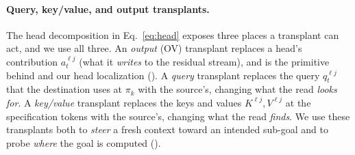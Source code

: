 \paragraph{Query, key/value, and output transplants.} The head decomposition in Eq.~\ref{eq:head} exposes three places a transplant can act, and we use all three. An \emph{output} (OV) transplant replaces a head's contribution $a_t^{\ell j}$ (what it \emph{writes} to the residual stream), and is the primitive behind \goalscope and our head localization (). A \emph{query} transplant replaces the query $q_t^{\ell j}$ that the destination uses at $\pi_k$ with the source's, changing what the read \emph{looks for}. A \emph{key/value} transplant replaces the keys and values $K^{\ell j}, V^{\ell j}$ at the specification tokens with the source's, changing what the read \emph{finds}. We use these transplants both to \emph{steer} a fresh context toward an intended sub-goal and to probe \emph{where} the goal is computed ().